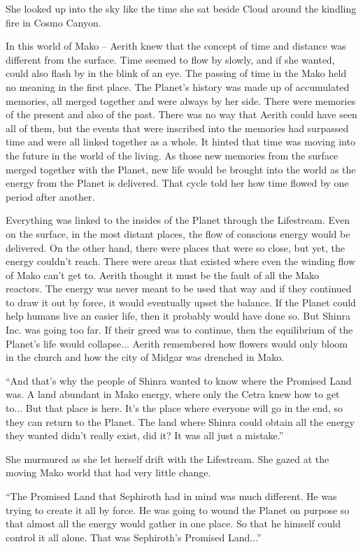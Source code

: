 \documentclass[oneside]{book}
\begin{document}
She looked up into the sky like the time she sat beside Cloud around the kindling fire in Cosmo Canyon.

\newpage
In this world of Mako – Aerith knew that the concept of time and distance was different from the surface. Time seemed to flow by slowly, and if she wanted, could also flash by in the blink of an eye. The passing of time in the Mako held no meaning in the first place. The Planet's history was made up of accumulated memories, all merged together and were always by her side. There were memories of the present and also of the past. There was no way that Aerith could have seen all of them, but the events that were inscribed into the memories had surpassed time and were all linked together as a whole. It hinted that time was moving into the future in the world of the living. As those new memories from the surface merged together with the Planet, new life would be brought into the world as the energy from the Planet is delivered. That cycle told her how time flowed by one period after another.

Everything was linked to the insides of the Planet through the Lifestream. Even on the surface, in the most distant places, the flow of conscious energy would be delivered. On the other hand, there were places that were so close, but yet, the energy couldn't reach. There were areas that existed where even the winding flow of Mako can't get to. Aerith thought it must be the fault of all the Mako reactors. The energy was never meant to be used that way and if they continued to draw it out by force, it would eventually upset the balance. If the Planet could help humans live an easier life, then it probably would have done so. But Shinra Inc. was going too far. If their greed was to continue, then the equilibrium of the Planet's life would collapse... Aerith remembered how flowers would only bloom in the church and how the city of Midgar was drenched in Mako.

“And that's why the people of Shinra wanted to know where the Promised Land was. A land abundant in Mako energy, where only the Cetra knew how to get to... But that place is here. It's the place where everyone will go in the end, so they can return to the Planet. The land where Shinra could obtain all the energy they wanted didn't really exist, did it? It was all just a mistake.”

She murmured as she let herself drift with the Lifestream. She gazed at the moving Mako world that had very little change.

“The Promised Land that Sephiroth had in mind was much different. He was trying to create it all by force. He was going to wound the Planet on purpose so that almost all the energy would gather in one place. So that he himself could control it all alone. That was Sephiroth's Promised Land...”
\end{document}
